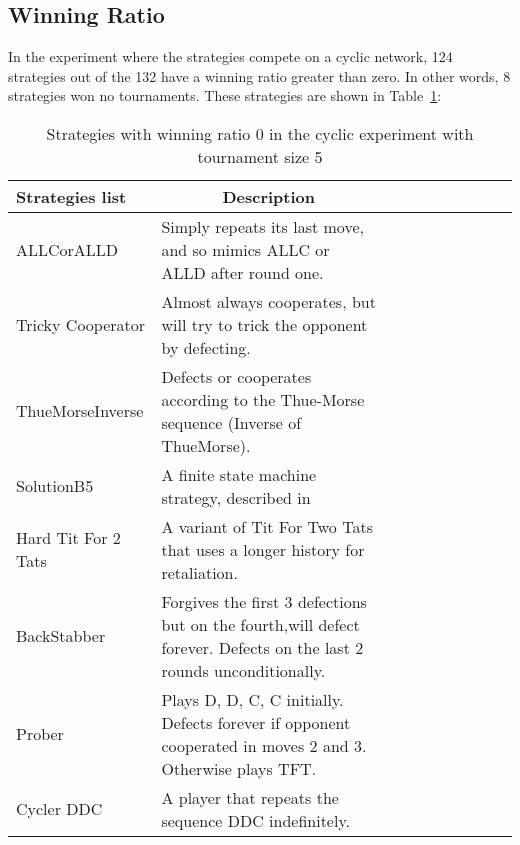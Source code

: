 \subsection{Winning Ratio}
\label{sub:winning_ratio}
In the experiment where the strategies compete on a cyclic network, 124 strategies
out of the 132 have a winning ratio greater than zero. In other words, 8 strategies
won no tournaments. These strategies are shown in Table~\ref{winning-ratio-zero-cyclic-five}:

\begin{table}[h]
	\centering
	\begin{adjustbox}{width=1\textwidth}
		\small
		\begin{tabular}{@{}|l|l|l|l|l|l|l|l|l|l|@{}}
			\hline
			\textbf{Strategies list}     & \multicolumn{1}{c|}{\textbf{Description}}                                                                                     \\ \hline
			ALLCorALLD          & Simply repeats its last move, and so mimics ALLC or ALLD after round one.                                            \\ \hline
			Tricky Cooperator   & Almost always cooperates, but will try to trick the opponent by defecting.                                           \\ \hline
			ThueMorseInverse    & Defects or cooperates according to the Thue-Morse sequence (Inverse of ThueMorse).                                   \\ \hline
			SolutionB5          & A finite state machine strategy, described in~\cite{Ashlock2015}  																									 \\ \hline
			Hard Tit For 2 Tats & A variant of Tit For Two Tats that uses a longer history for retaliation.                                            \\ \hline
			BackStabber         & Forgives the first 3 defections but on the fourth,will defect forever. Defects on the last 2 rounds unconditionally. \\ \hline
			Prober              & Plays D, D, C, C initially. Defects forever if opponent cooperated in moves 2 and 3. Otherwise plays TFT.            \\ \hline
			Cycler DDC          & A player that repeats the sequence DDC indefinitely.                                                                 \\ \hline
		\end{tabular}
	\end{adjustbox}
	\caption{Strategies with winning ratio 0 in the cyclic experiment with tournament
	size 5}
	\label{winning-ratio-zero-cyclic-five}
\end{table}

